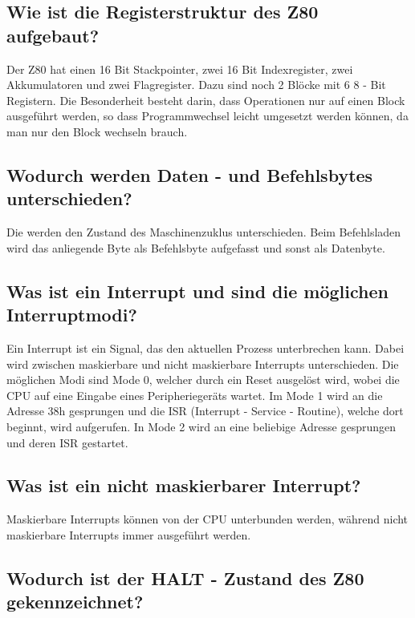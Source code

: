\documentclass[a4paper,11pt]{article}
\begin{document}
\subsection{Wie ist die Registerstruktur des Z80 aufgebaut?}

Der Z80 hat einen 16 Bit Stackpointer, zwei 16 Bit Indexregister, zwei Akkumulatoren und zwei Flagregister. Dazu sind noch 2 Blöcke mit 6 8 - Bit Registern. Die Besonderheit besteht darin, dass Operationen nur auf einen Block ausgeführt werden, so dass Programmwechsel leicht umgesetzt werden können, da man nur den Block wechseln brauch. 

\subsection{Wodurch werden Daten - und Befehlsbytes unterschieden?}

Die werden den Zustand des Maschinenzuklus unterschieden. Beim Befehlsladen wird das anliegende Byte als Befehlsbyte aufgefasst und sonst als Datenbyte. 

\subsection{Was ist ein Interrupt und sind die möglichen Interruptmodi?}

Ein Interrupt ist ein Signal, das den aktuellen Prozess unterbrechen kann. Dabei wird zwischen maskierbare und nicht maskierbare Interrupts unterschieden.
Die möglichen Modi sind Mode 0, welcher durch ein Reset ausgelöst wird, wobei die CPU auf eine Eingabe eines Peripheriegeräts wartet. Im Mode 1 wird an die Adresse 38h gesprungen und die ISR (Interrupt - Service - Routine), welche dort beginnt, wird aufgerufen. In Mode 2 wird an eine beliebige Adresse gesprungen und deren ISR gestartet.

\subsection{Was ist ein nicht maskierbarer Interrupt?}

Maskierbare Interrupts können von der CPU unterbunden werden, während nicht maskierbare Interrupts immer ausgeführt werden.

\subsection{Wodurch ist der HALT - Zustand des Z80 gekennzeichnet?}
\end{document}
